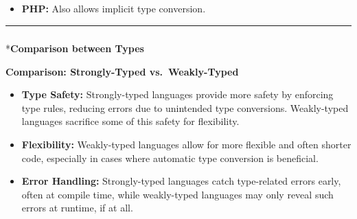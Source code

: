 \documentclass[
  letterpaper,
  DIV=11,
  numbers=noendperiod]{scrreprt}
\makeatletter
\let\oldsubparagraph\subparagraph
\renewcommand{\subparagraph}{
    \@ifstar
      \xxxSubParagraphStar
      \xxxSubParagraphNoStar
  }
\newcommand{\xxxSubParagraphStar}[1]{\oldsubparagraph*{#1}\mbox{}}
\newcommand{\xxxSubParagraphNoStar}[1]{\oldsubparagraph{#1}\mbox{}}
\newenvironment{Shaded}{\begin{snugshade}}{\end{snugshade}}
\newcommand{\ErrorTok}[1]{\textcolor[rgb]{0.68,0.00,0.00}{#1}}
\newcommand{\ExtensionTok}[1]{\textcolor[rgb]{0.00,0.23,0.31}{#1}}
\newcommand{\KeywordTok}[1]{\textcolor[rgb]{0.00,0.23,0.31}{\textbf{#1}}}
\newcommand{\NormalTok}[1]{\textcolor[rgb]{0.00,0.23,0.31}{#1}}
\newcommand{\StringTok}[1]{\textcolor[rgb]{0.13,0.47,0.30}{#1}}
\newcommand{\VariableTok}[1]{\textcolor[rgb]{0.07,0.07,0.07}{#1}}
\providecommand{\tightlist}{%
  \setlength{\itemsep}{0pt}\setlength{\parskip}{0pt}}
\makeatother
\begin{document}
\begin{itemize}
\tightlist
\item
  \textbf{PHP:} Also allows implicit type conversion.
\end{itemize}

\begin{Shaded}
\end{Shaded}

\begin{center}\rule{0.5\linewidth}{0.5pt}\end{center}

\subparagraph*{\texorpdfstring{\textbf{Comparison between
Types}}{Comparison between Types}}\label{comparison-between-types}

\begin{tcolorbox}[enhanced jigsaw, colframe=quarto-callout-note-color-frame, toprule=.15mm, bottomrule=.15mm, rightrule=.15mm, colback=white, breakable, arc=.35mm, opacityback=0, left=2mm, leftrule=.75mm]

\vspace{-3mm}\textbf{Comparison: Strongly-Typed vs.~Weakly-Typed}\vspace{3mm}

\begin{itemize}
\tightlist
\item
  \textbf{Type Safety:} Strongly-typed languages provide more safety by
  enforcing type rules, reducing errors due to unintended type
  conversions. Weakly-typed languages sacrifice some of this safety for
  flexibility.
\item
  \textbf{Flexibility:} Weakly-typed languages allow for more flexible
  and often shorter code, especially in cases where automatic type
  conversion is beneficial.
\item
  \textbf{Error Handling:} Strongly-typed languages catch type-related
  errors early, often at compile time, while weakly-typed languages may
  only reveal such errors at runtime, if at all.
\end{itemize}

\end{tcolorbox}
\end{document}
